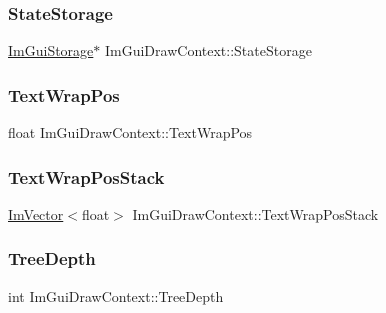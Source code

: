 \hypertarget{struct_im_gui_draw_context_a507947c789f377ba13767061557fd348}{}\label{struct_im_gui_draw_context_a507947c789f377ba13767061557fd348} 
\subsubsection{\texorpdfstring{State\+Storage}{StateStorage}}
{\footnotesize\ttfamily \hyperlink{struct_im_gui_storage}{Im\+Gui\+Storage}$\ast$ Im\+Gui\+Draw\+Context\+::\+State\+Storage}

\hypertarget{struct_im_gui_draw_context_a0488b6a84b2f26ddd536fef2ae3f96c3}{}\label{struct_im_gui_draw_context_a0488b6a84b2f26ddd536fef2ae3f96c3} 
\subsubsection{\texorpdfstring{Text\+Wrap\+Pos}{TextWrapPos}}
{\footnotesize\ttfamily float Im\+Gui\+Draw\+Context\+::\+Text\+Wrap\+Pos}

\hypertarget{struct_im_gui_draw_context_ac282b2f910a8846f4c200c358974b12a}{}\label{struct_im_gui_draw_context_ac282b2f910a8846f4c200c358974b12a} 
\subsubsection{\texorpdfstring{Text\+Wrap\+Pos\+Stack}{TextWrapPosStack}}
{\footnotesize\ttfamily \hyperlink{class_im_vector}{Im\+Vector}$<$float$>$ Im\+Gui\+Draw\+Context\+::\+Text\+Wrap\+Pos\+Stack}

\hypertarget{struct_im_gui_draw_context_a08d8578fe382425a67b4f5e5257b5436}{}\label{struct_im_gui_draw_context_a08d8578fe382425a67b4f5e5257b5436} 
\subsubsection{\texorpdfstring{Tree\+Depth}{TreeDepth}}
{\footnotesize\ttfamily int Im\+Gui\+Draw\+Context\+::\+Tree\+Depth}

